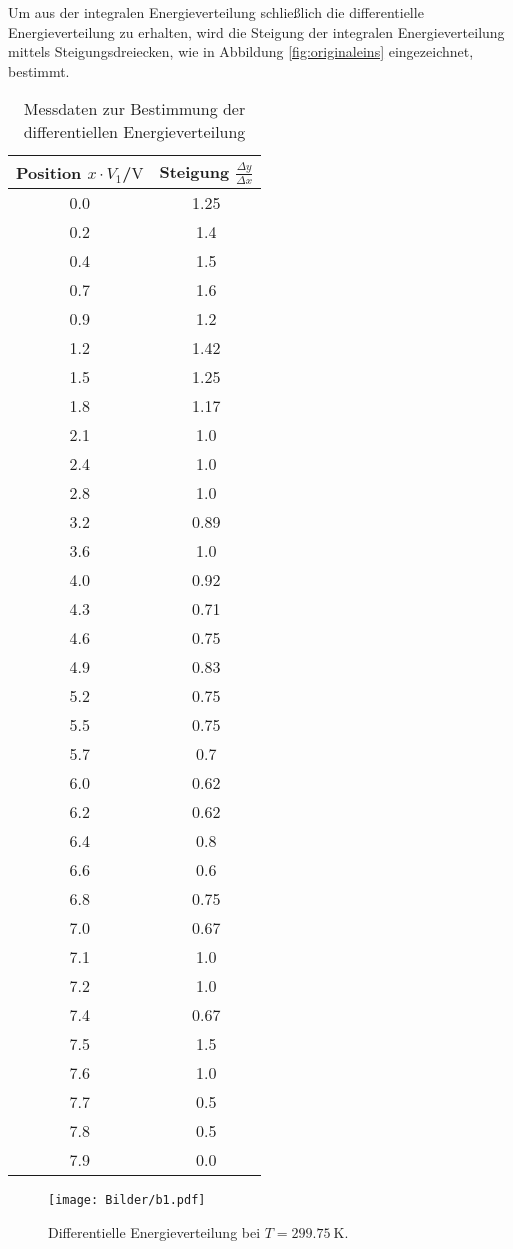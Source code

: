 Um aus der integralen Energieverteilung schließlich die differentielle Energieverteilung zu erhalten, wird die Steigung der integralen Energieverteilung mittels Steigungsdreiecken, wie in Abbildung \ref{fig:originaleins} eingezeichnet, bestimmt.
\begin{table}
	\centering
	\caption{Messdaten zur Bestimmung der differentiellen Energieverteilung}
	\label{tab:tab2}
\begin{tabular}{cc}
\toprule
Position $x \cdot V_1$/$\si{\volt}$&Steigung $\frac{\Delta y}{\Delta x}$\\
\midrule
0.0 & 1.25 \\
0.2 & 1.4 \\
0.4 & 1.5 \\
0.7 & 1.6 \\
0.9 & 1.2 \\
1.2 & 1.42 \\
1.5 & 1.25 \\
1.8 & 1.17 \\
2.1 & 1.0 \\
2.4 & 1.0 \\
2.8 & 1.0 \\
3.2 & 0.89 \\
3.6 & 1.0 \\
4.0 & 0.92 \\
4.3 & 0.71 \\
4.6 & 0.75 \\
4.9 & 0.83 \\
5.2 & 0.75 \\
5.5 & 0.75 \\
5.7 & 0.7 \\
6.0 & 0.62 \\
6.2 & 0.62 \\
6.4 & 0.8 \\
6.6 & 0.6 \\
6.8 & 0.75 \\
7.0 & 0.67 \\
7.1 & 1.0 \\
7.2 & 1.0 \\
7.4 & 0.67 \\
7.5 & 1.5 \\
7.6 & 1.0 \\
7.7 & 0.5 \\
7.8 & 0.5 \\
7.9 & 0.0 \\
\bottomrule
\end{tabular}
\end{table}
\begin{figure}
  \centering
  \texttt{[image: Bilder/b1.pdf]}
  \caption{Differentielle Energieverteilung bei $T=\SI{299.75}{\kelvin}$.}
  \label{fig:plot}
\end{figure}
